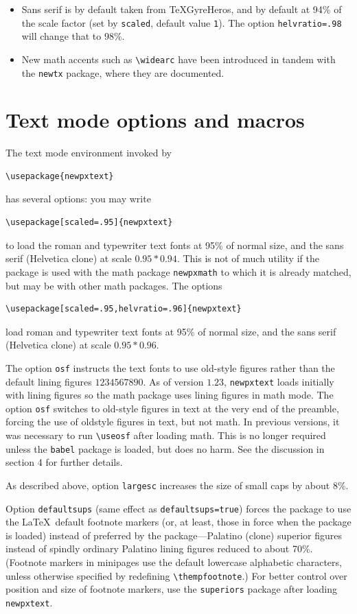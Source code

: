\documentclass[11pt]{article}
\theoremstyle{oldplain}
\theoremstyle{plain}
\begin{document}
\begin{itemize}
\item Sans serif is by default taken from TeXGyreHeros, and by default at 94\% of the scale factor (set by {\tt scaled}, default value {\tt1}). The option {\tt helvratio=.98} will change that to 98\%.
\item New math accents such as \verb|\widearc| have been introduced in tandem with the {\tt newtx} package, where they are documented.
\end{itemize}
\section{Text mode options and macros}
The text mode environment invoked by
\begin{verbatim}
\usepackage{newpxtext}
\end{verbatim}
has several options: you may write
\begin{verbatim}
\usepackage[scaled=.95]{newpxtext}
\end{verbatim}
to load the roman and typewriter text fonts at 95\% of normal size, and the sans serif (\textsf{Helvetica} clone) at scale $0.95*0.94$. This is not of much utility if the package is used with the math package {\tt newpxmath} to which it is already matched, but may be with other math packages. The options
\begin{verbatim}
\usepackage[scaled=.95,helvratio=.96]{newpxtext}
\end{verbatim}
load roman and typewriter text fonts at 95\% of normal size, and the sans serif (\textsf{Helvetica} clone) at scale $0.95*0.96$.

The option \texttt{osf} instructs the text fonts to use old-style figures  rather than the default lining figures $1234567890$. As of version $1.23$, {\tt newpxtext} loads initially with lining figures so the math package uses lining figures in math mode. The option {\tt osf} switches to old-style figures in text at the very end of the preamble, forcing the use of oldstyle figures in text, but not math. In previous versions, it was necessary to run 
\verb|\useosf| after loading math. This is no longer required unless the {\tt babel} package is loaded, but does no harm. See the discussion in section 4 for further details.



As described above, option {\tt largesc} increases the size of small caps by about 8\%.

Option {\tt defaultsups} (same effect as {\tt defaultsups=true}) forces the package to use the \LaTeX\ default footnote markers (or, at least, those in force when the package is loaded) instead of preferred by the package---Palatino (clone) superior figures instead of spindly ordinary Palatino lining figures reduced to about 70\%. (Footnote markers in minipages use the default lowercase alphabetic characters, unless otherwise specified by redefining \verb|\thempfootnote|.) For better control over position and size of footnote markers, use the {\tt superiors} package after loading {\tt newpxtext}. 
\end{document}
